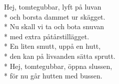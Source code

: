 \begin{SongText}
    \begin{SongVerse}
        Hej, tomtegubbar, lyft på luvan\\*%
        och borsta dammet ur skägget.\\*%
        Nu skall vi ta och bota snuvan\\*%
        med extra påtårstillägget.\\*%
        En liten smutt, uppå en hutt,\\*%
        den kan på livsanden sätta sprutt.\\*%
        Hej, tomtegubbar, öppna slussen,\\*%
        för nu går hutten med bussen.
    \end{SongVerse}
\end{SongText}
